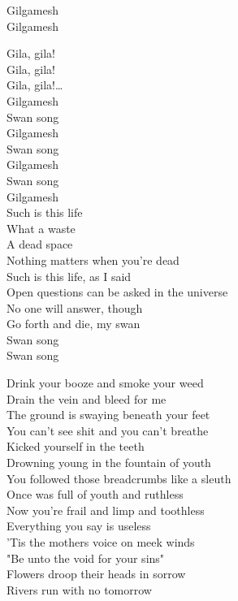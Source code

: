 Gilgamesh\\
Gilgamesh\\


Gila, gila!\\
Gila, gila!\\
Gila, gila!…\\

Gilgamesh\\
Swan song\\
Gilgamesh\\
Swan song\\
Gilgamesh\\
Swan song\\

Gilgamesh\\

Such is this life\\
What a waste\\
A dead space\\
Nothing matters when you're dead\\
Such is this life, as I said\\
Open questions can be asked in the universe\\
No one will answer, though\\
Go forth and die, my swan\\

Swan song\\
Swan song\\



Drink your booze and smoke your weed\\
Drain the vein and bleed for me\\
The ground is swaying beneath your feet\\
You can't see shit and you can't breathe\\
Kicked yourself in the teeth\\
Drowning young in the fountain of youth\\
You followed those breadcrumbs like a sleuth\\
Once was full of youth and ruthless\\
Now you're frail and limp and toothless\\
Everything you say is useless\\

'Tis the mothers voice on meek winds\\
"Be unto the void for your sins"\\
Flowers droop their heads in sorrow\\
Rivers run with no tomorrow\\

